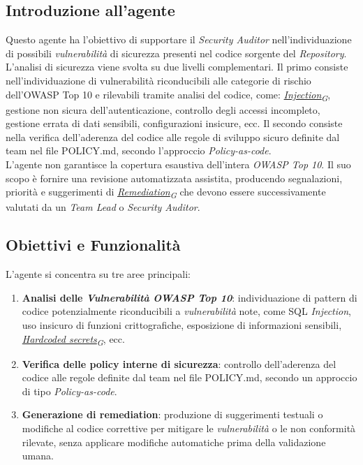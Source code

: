 \documentclass[12pt, a4paper]{article}
\newcommand{\urlglossario}{https://skynetunigroup.github.io/Code_Guardian/Documentazione/PB/glossario_v2.0.0.pdf} %
\newcommand{\glo}[2]{\href{\urlglossario\#nameddest=#2}{#1\textsubscript{G}}}
\begin{document}
\subsection{Introduzione all'agente}
Questo agente ha l'obiettivo di supportare il \textit{Security Auditor} nell'individuazione di possibili \textit{vulnerabilità} di sicurezza presenti nel codice sorgente del \textit{Repository}. L’analisi di sicurezza viene svolta su due livelli complementari. Il primo consiste nell’individuazione di vulnerabilità riconducibili alle categorie di rischio dell’OWASP Top 10 e rilevabili tramite analisi del codice, come: \textit{\glo{Injection}{injection}}, gestione non sicura dell'autenticazione, controllo degli accessi incompleto, gestione errata di dati sensibili, configurazioni insicure, ecc. Il secondo consiste nella verifica dell’aderenza del codice alle regole di sviluppo sicuro definite dal team nel file POLICY.md, secondo l'approccio \textit{Policy-as-code}.
\\ 
L'agente non garantisce la copertura esaustiva dell'intera \textit{OWASP Top 10}. Il suo scopo è fornire una revisione automatizzata assistita, producendo segnalazioni, priorità e suggerimenti di \textit{\glo{Remediation}{remediation}} che devono essere successivamente valutati da un \textit{Team Lead} o \textit{Security Auditor}.

\subsection{Obiettivi e Funzionalità}
L'agente si concentra su tre aree principali:
\begin{enumerate}
\item \textbf{Analisi delle \textit{Vulnerabilità} \textit{OWASP Top 10}}: individuazione di pattern di codice potenzialmente riconducibili a \textit{vulnerabilità} note, come SQL \textit{Injection}, uso insicuro di funzioni crittografiche, esposizione di informazioni sensibili, \textit{\glo{Hardcoded secrets}{hardcoded-secrets}}, ecc.
\item \textbf{Verifica delle policy interne di sicurezza}: controllo dell'aderenza del codice alle regole definite dal team nel file POLICY.md, secondo un approccio di tipo \textit{Policy-as-code}.
\item \textbf{Generazione di remediation}: produzione di suggerimenti testuali o modifiche al codice correttive per mitigare le \textit{vulnerabilità} o le non conformità rilevate, senza applicare modifiche automatiche prima della validazione umana.
\end{enumerate}
\end{document}
